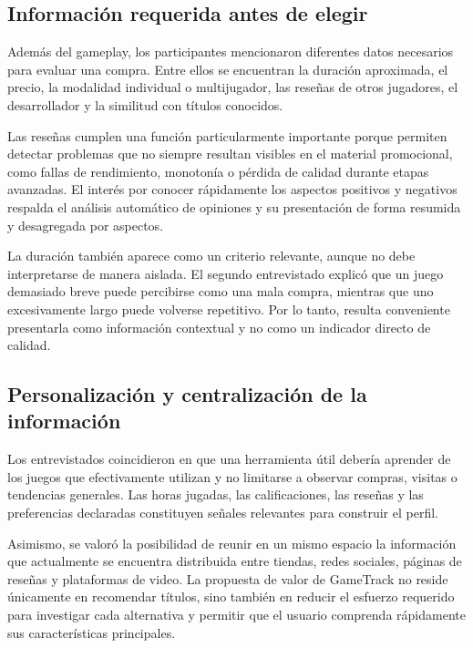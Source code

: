 \subsection{Información requerida antes de elegir}\label{subsec:informacion_requerida}

Además del gameplay, los participantes mencionaron diferentes datos necesarios para evaluar una compra. Entre ellos se encuentran la duración aproximada, el precio, la modalidad individual o multijugador, las reseñas de otros jugadores, el desarrollador y la similitud con títulos conocidos.

Las reseñas cumplen una función particularmente importante porque permiten detectar problemas que no siempre resultan visibles en el material promocional, como fallas de rendimiento, monotonía o pérdida de calidad durante etapas avanzadas. El interés por conocer rápidamente los aspectos positivos y negativos respalda el análisis automático de opiniones y su presentación de forma resumida y desagregada por aspectos.

La duración también aparece como un criterio relevante, aunque no debe interpretarse de manera aislada. El segundo entrevistado explicó que un juego demasiado breve puede percibirse como una mala compra, mientras que uno excesivamente largo puede volverse repetitivo. Por lo tanto, resulta conveniente presentarla como información contextual y no como un indicador directo de calidad.

\subsection{Personalización y centralización de la información}\label{subsec:personalizacion_centralizacion}

Los entrevistados coincidieron en que una herramienta útil debería aprender de los juegos que efectivamente utilizan y no limitarse a observar compras, visitas o tendencias generales. Las horas jugadas, las calificaciones, las reseñas y las preferencias declaradas constituyen señales relevantes para construir el perfil.

Asimismo, se valoró la posibilidad de reunir en un mismo espacio la información que actualmente se encuentra distribuida entre tiendas, redes sociales, páginas de reseñas y plataformas de video. La propuesta de valor de GameTrack no reside únicamente en recomendar títulos, sino también en reducir el esfuerzo requerido para investigar cada alternativa y permitir que el usuario comprenda rápidamente sus características principales.

